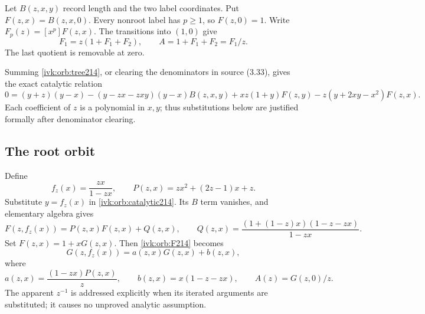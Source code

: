 \documentclass[11pt,letterpaper]{article}
\theoremstyle{remark}\newtheorem{remark}[theorem]{Remark}
\begin{document}
Let $B(z,x,y)$ record length and the two label coordinates. Put
$F(z,x)=B(z,x,0)$. Every nonroot label has $p\ge1$, so $F(z,0)=1$.
Write $F_p(z)=[x^p]F(z,x)$. The transitions into $(1,0)$ give
\begin{equation}\label{ivk:orb:normalize214}
F_1=z(1+F_1+F_2),\qquad
A=1+F_1+F_2=F_1/z.
\end{equation}
The last quotient is removable at zero.

Summing \eqref{ivk:orb:tree214}, or clearing the denominators in source
(3.33), gives the exact catalytic relation
\begin{equation}\label{ivk:orb:catalytic214}
0=(y+z)(y-x)-(y-zx-zxy)(y-x)B(z,x,y)
+xz(1+y)F(z,y)-z(y+2xy-x^2)F(z,x).
\end{equation}
Each coefficient of $z$ is a polynomial in $x,y$; thus substitutions
below are justified formally after denominator clearing.

\subsection{The root orbit}
Define
\begin{equation}\label{ivk:orb:kernel214}
f_z(x)=\frac{zx}{1-zx},\qquad
P(z,x)=zx^2+(2z-1)x+z.
\end{equation}
Substitute $y=f_z(x)$ in \eqref{ivk:orb:catalytic214}. Its $B$ term vanishes,
and elementary algebra gives
\begin{equation}\label{ivk:orb:F214}
F(z,f_z(x))=P(z,x)F(z,x)+Q(z,x),\qquad
Q(z,x)=\frac{(1+(1-z)x)(1-z-zx)}{1-zx}.
\end{equation}
Set $F(z,x)=1+xG(z,x)$. Then \eqref{ivk:orb:F214} becomes
\begin{equation}\label{ivk:orb:G214}
G(z,f_z(x))=a(z,x)G(z,x)+b(z,x),
\end{equation}
where
\begin{equation}\label{ivk:orb:ab214}
a(z,x)=\frac{(1-zx)P(z,x)}z,
\qquad b(z,x)=x(1-z-zx),\qquad A(z)=G(z,0)/z.
\end{equation}
The apparent $z^{-1}$ is addressed explicitly when its iterated arguments
are substituted; it causes no unproved analytic assumption.
\end{document}
